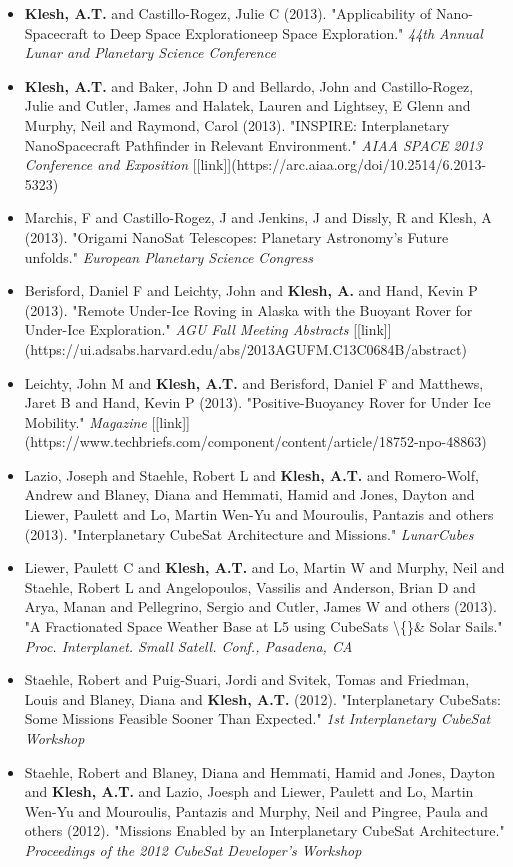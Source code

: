 \documentclass[11pt,letterpaper]{article}
\begin{document}
\begin{itemize}
\item \textbf{Klesh, A.T.} and Castillo-Rogez, Julie C (2013). "Applicability of Nano-Spacecraft to Deep Space Explorationeep Space Exploration." \textit{44th Annual Lunar and Planetary Science Conference}
\item \textbf{Klesh, A.T.} and Baker, John D and Bellardo, John and Castillo-Rogez, Julie and Cutler, James and Halatek, Lauren and Lightsey, E Glenn and Murphy, Neil and Raymond, Carol (2013). "INSPIRE: Interplanetary NanoSpacecraft Pathfinder in Relevant Environment." \textit{AIAA SPACE 2013 Conference and Exposition} [[link]](https://arc.aiaa.org/doi/10.2514/6.2013-5323)
\item Marchis, F and Castillo-Rogez, J and Jenkins, J and Dissly, R and Klesh, A (2013). "Origami NanoSat Telescopes: Planetary Astronomy's Future unfolds." \textit{European Planetary Science Congress}
\item Berisford, Daniel F and Leichty, John and \textbf{Klesh, A.} and Hand, Kevin P (2013). "Remote Under-Ice Roving in Alaska with the Buoyant Rover for Under-Ice Exploration." \textit{AGU Fall Meeting Abstracts} [[link]](https://ui.adsabs.harvard.edu/abs/2013AGUFM.C13C0684B/abstract)
\item Leichty, John M and \textbf{Klesh, A.T.} and Berisford, Daniel F and Matthews, Jaret B and Hand, Kevin P (2013). "Positive-Buoyancy Rover for Under Ice Mobility." \textit{Magazine} [[link]](https://www.techbriefs.com/component/content/article/18752-npo-48863)
\item Lazio, Joseph and Staehle, Robert L and \textbf{Klesh, A.T.} and Romero-Wolf, Andrew and Blaney, Diana and Hemmati, Hamid and Jones, Dayton and Liewer, Paulett and Lo, Martin Wen-Yu and Mouroulis, Pantazis and others (2013). "Interplanetary CubeSat Architecture and Missions." \textit{LunarCubes}
\item Liewer, Paulett C and \textbf{Klesh, A.T.} and Lo, Martin W and Murphy, Neil and Staehle, Robert L and Angelopoulos, Vassilis and Anderson, Brian D and Arya, Manan and Pellegrino, Sergio and Cutler, James W and others (2013). "A Fractionated Space Weather Base at L5 using CubeSats \textbackslash\{\}\& Solar Sails." \textit{Proc. Interplanet. Small Satell. Conf., Pasadena, CA}
\item Staehle, Robert and Puig-Suari, Jordi and Svitek, Tomas and Friedman, Louis and Blaney, Diana and \textbf{Klesh, A.T.} (2012). "Interplanetary CubeSats: Some Missions Feasible Sooner Than Expected." \textit{1st Interplanetary CubeSat Workshop}
\item Staehle, Robert and Blaney, Diana and Hemmati, Hamid and Jones, Dayton and \textbf{Klesh, A.T.} and Lazio, Joesph and Liewer, Paulett and Lo, Martin Wen-Yu and Mouroulis, Pantazis and Murphy, Neil and Pingree, Paula and others (2012). "Missions Enabled by an Interplanetary CubeSat Architecture." \textit{Proceedings of the 2012 CubeSat Developer's Workshop}

\end{itemize}
\end{document}
